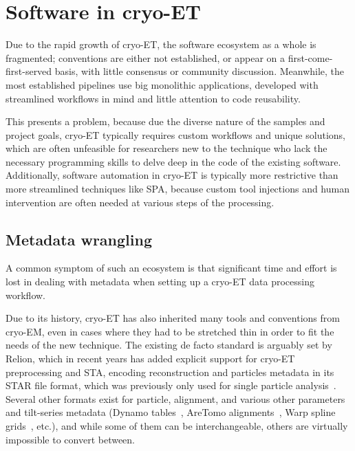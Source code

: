 \chapter{Software in cryo-ET}\label{software}

Due to the rapid growth of cryo-ET, the software ecosystem as a whole is fragmented; conventions are either not established, or appear on a first-come-first-served basis, with little consensus or community discussion.
Meanwhile, the most established pipelines use big monolithic applications, developed with streamlined workflows in mind and little attention to code reusability.

This presents a problem, because due the diverse nature of the samples and project goals, cryo-ET typically requires custom workflows and unique solutions, which are often unfeasible for researchers new to the technique who lack the necessary programming skills to delve deep in the code of the existing software.
Additionally, software automation in cryo-ET is typically more restrictive than more streamlined techniques like SPA, because custom tool injections and human intervention are often needed at various steps of the processing.

\localtableofcontents

\section{Metadata wrangling}

A common symptom of such an ecosystem is that significant time and effort is lost in dealing with metadata when setting up a cryo-ET data processing workflow.

Due to its history, cryo-ET has also inherited many tools and conventions from cryo-EM, even in cases where they had to be stretched thin in order to fit the needs of the new technique.
The existing de facto standard is arguably set by Relion, which in recent years has added explicit support for cryo-ET preprocessing and STA, encoding reconstruction and particles metadata in its STAR file format, which was previously only used for single particle analysis~\cite{zivanovBayesianApproachSingleparticle2022,burtImageProcessingPipeline2024}.
Several other formats exist for particle, alignment, and various other parameters and tilt-series metadata (Dynamo tables~\cite{castano-diezDynamoCatalogueGeometrical2017}, AreTomo alignments~\cite{zhengAreTomoIntegratedSoftware2022}, Warp spline grids~\cite{tegunovRealtimeCryoelectronMicroscopy2019}, etc.), and while some of them can be interchangeable, others are virtually impossible to convert between.

